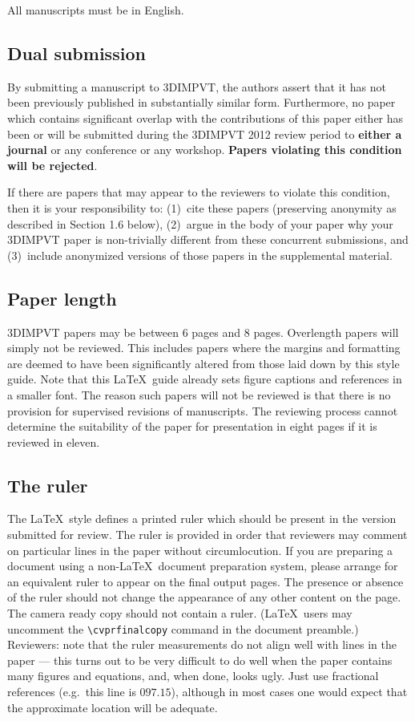 \message{ !name(egpaper_for_review.tex)}\documentclass[10pt,twocolumn,letterpaper]{article}
\begin{document}
All manuscripts must be in English.

\subsection{Dual submission}

By submitting a manuscript to 3DIMPVT, the authors assert that it has
not been previously published in substantially similar
form. Furthermore, no paper which contains significant overlap with
the contributions of this paper either has been or will be submitted
during the 3DIMPVT 2012 review period to {\bf either a journal} or any
conference or any workshop.  {\bf Papers violating this condition will
  be rejected}.

If there are papers that may appear to the reviewers to violate this
condition, then it is your responsibility to: (1)~cite these papers
(preserving anonymity as described in Section 1.6 below), (2)~argue in
the body of your paper why your 3DIMPVT paper is non-trivially
different from these concurrent submissions, and (3)~include
anonymized versions of those papers in the supplemental material.

\subsection{Paper length}
3DIMPVT papers may be between 6 pages and 8 pages.  Overlength papers
will simply not be reviewed.  This includes papers where the margins
and formatting are deemed to have been significantly altered from
those laid down by this style guide.  Note that this \LaTeX\ guide
already sets figure captions and references in a smaller font.  The
reason such papers will not be reviewed is that there is no provision
for supervised revisions of manuscripts.  The reviewing process cannot
determine the suitability of the paper for presentation in eight pages
if it is reviewed in eleven.

\subsection{The ruler}
The \LaTeX\ style defines a printed ruler which should be present in
the version submitted for review.  The ruler is provided in order that
reviewers may comment on particular lines in the paper without
circumlocution.  If you are preparing a document using a non-\LaTeX\
document preparation system, please arrange for an equivalent ruler to
appear on the final output pages.  The presence or absence of the
ruler should not change the appearance of any other content on the
page.  The camera ready copy should not contain a ruler. (\LaTeX\
users may uncomment the \verb'\cvprfinalcopy' command in the document
preamble.)  Reviewers: note that the ruler measurements do not align
well with lines in the paper --- this turns out to be very difficult
to do well when the paper contains many figures and equations, and,
when done, looks ugly.  Just use fractional references (e.g.\ this
line is $097.15$), although in most cases one would expect that the
approximate location will be adequate.
\end{document}
